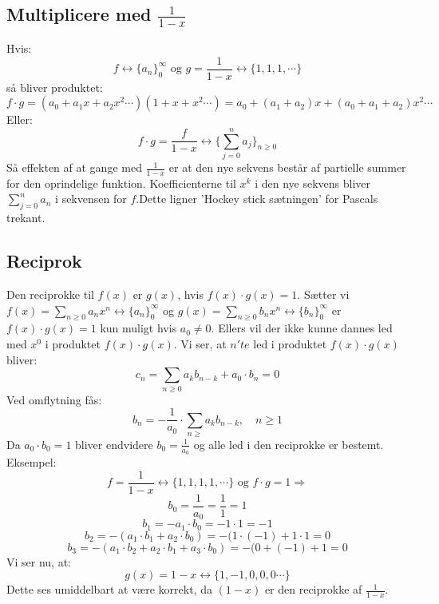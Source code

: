 \subsection*{Multiplicere med \(\frac{1}{1-x}\)}
Hvis:
\[f \leftrightarrow \{a_{n}\}_{0}^{\infty} \text{ og } g=\frac{1}{1-x}  \leftrightarrow \{1,1,1, \dotsm\}\]
så bliver produktet:
\[f \cdot g = (a_{0}+a_{1}x+a_{2}x^{2} \dotsm)(1+x+x^{2} \dotsm)=a_{0}+(a_{1}+a_{2})x+(a_{0}+a_{1}+a_{2})x^{2} \dotsm\]
Eller:
\[f \cdot g =\frac{f}{1-x} \leftrightarrow \{\sum_{j=0}^{n}a_{j}\}_{n \geq 0}\]
Så effekten af at gange med \(\frac{1}{1-x}\) er at den nye sekvens består af partielle summer for den oprindelige funktion. Koefficienterne til \(x^{k}\) i den nye sekvens bliver \(\sum_{j=0}^{n}a_{n}\) i sekvensen for \(f\).Dette ligner 'Hockey stick sætningen' for Pascals trekant.
\subsection*{Reciprok}
Den reciprokke til \(f(x)\) er \(g(x)\), hvis \(f(x) \cdot g(x)=1\). Sætter vi \(f(x)=\sum_{n \geq 0}a_{n}x^{n} \leftrightarrow \{a_{n}\}_{0}^{\infty}\) og \(g(x)=\sum_{n \geq 0}b_{n}x^{n}  \leftrightarrow \{b_{n}\}_{0}^{\infty}\) er \(f(x) \cdot g(x)=1\) kun muligt hvis \(a_{0} \neq 0\). Ellers vil der ikke kunne dannes led med \(x^{0}\) i produktet \(f(x) \cdot g(x)\). Vi ser, at \(n'te\) led i produktet \(f(x) \cdot g(x)\) bliver:
\[c_{n}=\sum_{n \geq 0}a_{k}b_{n-k}+a_{0} \cdot b_{n}=0\]
Ved omflytning fås:
\[b_{n}=-\frac{1}{a_{0}} \cdot \sum_{n \geq}a_{k}b_{n-k}, \quad n \geq 1\]
Da \(a_{0} \cdot b_{0}=1\) bliver endvidere \(b_{0}=\frac{1}{a_{0}}\) og alle led i den reciprokke er bestemt.\\
Eksempel:
\[f=\frac{1}{1-x} \leftrightarrow \{1,1,1,1, \dotsm\} \text{ og } f \cdot g=1 \Rightarrow\]
\[b_{0}=\frac{1}{a_{0}}=\frac{1}{1}=1\]
\[b_{1}=-a_{1} \cdot b_{0}=-1 \cdot 1=-1\]
\[b_{2}=-(a_{1} \cdot b_{1}+a_{2} \cdot b_{0})=-(1 \cdot (-1)+1 \cdot 1=0\]
\[b_{3}=-(a_{1} \cdot b_{2}+a_{2} \cdot b_{1}+a_{3} \cdot b_{0})=-(0+(-1)+1=0\]
Vi ser nu, at:
\[g(x)=1-x \leftrightarrow \{1,-1,0,0,0 \dotsm\}\]
Dette ses umiddelbart at være korrekt, da \((1-x)\) er den reciprokke af \(\frac{1}{1-x}\).
